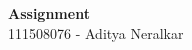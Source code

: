 \documentclass[main.tex]{subfiles}
\begin{document}
\begin{titlepage}

\begin{center}
  \LARGE{\bf{Assignment \asgnno\\}}
  \horrule{0.4pt}
  111508076 - Aditya Neralkar \\
\end{center}
\horrule{0.4pt}
\end{titlepage}
\end{document}
